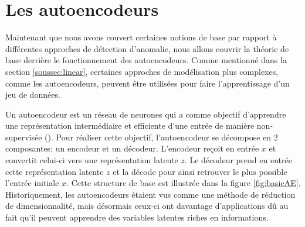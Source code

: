 \section{Les autoencodeurs}

Maintenant que nous avons couvert certaines notions de base par rapport à différentes approches de détection d'anomalie, nous allons couvrir la théorie de base derrière le fonctionnement des autoencodeurs. Comme mentionné dans la section \ref{soussec:linear}, certaines approches de modélisation plus complexes, comme les autoencodeurs, peuvent être utilisées pour faire l'apprentissage d'un jeu de données. 

Un autoencodeur est un réseau de neurones qui a comme objectif d'apprendre une représentation intermédiaire et efficiente d'une entrée de manière non-supervisée (\cite{Goodfellow-et-al-2016}). Pour réaliser cette objectif, l'autoencodeur se décompose en 2 composantes: un encodeur et un décodeur. L'encodeur reçoit en entrée $x$ et convertit celui-ci vers une représentation latente $z$. Le décodeur prend en entrée cette représentation latente $z$ et la décode pour ainsi retrouver le plus possible l'entrée initiale $x$. Cette structure de base est illustrée dans la figure \ref{fig:basicAE}. Historiquement, les autoencodeurs étaient vus comme une méthode de réduction de dimensionnalité, mais désormais ceux-ci ont davantage d'applications dû au fait qu'il peuvent apprendre des variables latentes riches en informations. \newline

